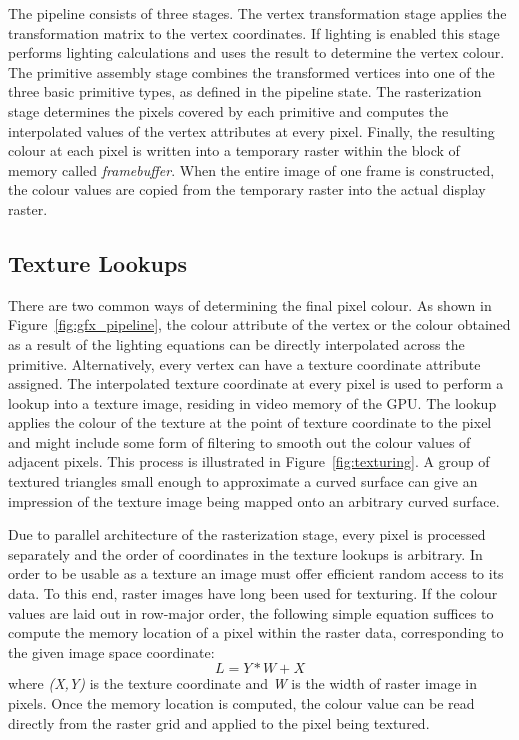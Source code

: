 \documentclass[11pt,a4paper,twoside]{article}
\begin{document}
The pipeline consists of three stages. The vertex transformation stage applies the transformation matrix to the vertex coordinates. If lighting is enabled this stage performs lighting calculations and uses the result to determine the vertex colour. The primitive assembly stage combines the transformed vertices into one of the three basic primitive types, as defined in the pipeline state. The rasterization stage determines the pixels covered by each primitive and computes the interpolated values of the vertex attributes at every pixel. Finally, the resulting colour at each pixel is written into a temporary raster within the block of memory called \emph{framebuffer}. When the entire image of one frame is constructed, the colour values are copied from the temporary raster into the actual display raster.

\subsection{Texture Lookups}

There are two common ways of determining the final pixel colour. As shown in Figure~\ref{fig:gfx_pipeline}, the colour attribute of the vertex or the colour obtained as a result of the lighting equations can be directly interpolated across the primitive. Alternatively, every vertex can have a texture coordinate attribute assigned. The interpolated texture coordinate at every pixel is used to perform a lookup into a texture image, residing in video memory of the GPU. The lookup applies the colour of the texture at the point of texture coordinate to the pixel and might include some form of filtering to smooth out the colour values of adjacent pixels. This process is illustrated in Figure~\ref{fig:texturing}. A group of textured triangles small enough to approximate a curved surface can give an impression of the texture image being mapped onto an arbitrary curved surface.

Due to parallel architecture of the rasterization stage, every pixel is processed separately and the order of coordinates in the texture lookups is arbitrary. In order to be usable as a texture an image must offer efficient random access to its data. To this end, raster images have long been used for texturing. If the colour values are laid out in row-major order, the following simple equation suffices to compute the memory location of a pixel within the raster data, corresponding to the given image space coordinate:
\[ L = Y * W + X \]
where \emph{(X,Y)} is the texture coordinate and \emph{W} is the width of raster image in pixels. Once the memory location is computed, the colour value can be read directly from the raster grid and applied to the pixel being textured.
\end{document}
